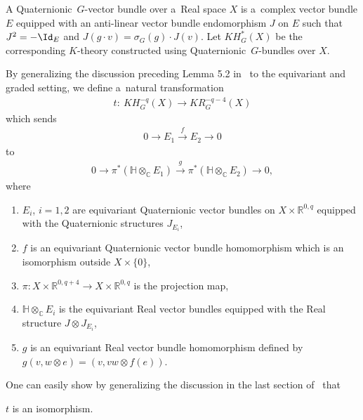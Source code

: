 \begin{Definition}
A Quaternionic~$G$-vector bundle over a~Real space $X$ is a~complex vector bundle $E$ equipped with an anti-linear
vector bundle endomorphism $J$ on $E$ such that $J^2=-\Id_E$ and $J(g\cdot v)=
\sigma_G(g)\cdot J(v)$.
Let $KH^*_G(X)$ be the corresponding $K$-theory constructed using Quaternionic~$G$-bundles over $X$.
\end{Definition}
By generalizing the discussion preceding Lemma 5.2 in~\cite{Se} to the equivariant and graded setting, we def\/ine
a~natural transformation
\begin{gather*}
t: \ KH_G^{-q}(X)\to KR^{-q-4}_G(X)
\end{gather*}
which sends
\begin{gather*}
0\longrightarrow E_1
\stackrel{f}
{\longrightarrow} E_2\longrightarrow 0
\end{gather*}
to
\begin{gather*}
0\longrightarrow \pi^*(\mathbb{H}\otimes_\mathbb{C} E_1)\stackrel{g}
{\longrightarrow}\pi^*(\mathbb{H}\otimes_\mathbb{C}E_2)\longrightarrow 0,
\end{gather*}
where
\begin{enumerate}\itemsep=0pt
\item[1)]
$E_i$, $i=1, 2$ are equivariant Quaternionic vector bundles on $X\times\mathbb{R}^{0, q}$ equipped with the Quaternionic
structures $J_{E_i}$,
\item[2)]
$f$ is an equivariant Quaternionic vector bundle homomorphism which is an isomorphism outside $X\times\{0\}$,
\item[3)]
$\pi: X\times\mathbb{R}^{0, q+4}\to X\times\mathbb{R}^{0, q}$ is the projection map,
\item[4)]
$\mathbb{H}\otimes_\mathbb{C}E_i$ is the equivariant Real vector bundles equipped with the Real structure $J\otimes J_{E_i}$,
\item[5)]
$g$ is an equivariant Real vector bundle homomorphism def\/ined by $g(v, w\otimes e)=(v, vw\otimes f(e))$.
\end{enumerate}

One can easily show by generalizing the discussion in the last section of~\cite{AS} that
\begin{Proposition}
\label{shiftbyfour}
$t$ is an isomorphism.
\end{Proposition}

